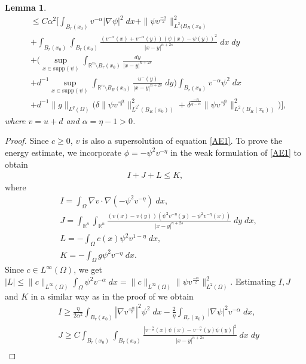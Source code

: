 \documentclass[11pt, notitlepage]{article}
\def\R{\mathbb{R}}
\newtheorem{Lemma}[Theorem]{Lemma}
\begin{document}
{\begin{Lemma}
\begin{align}
        &\leq C\alpha^2\Big[\int_{B_r(x_0)}v^{-\alpha}|\nabla\psi|^2\;dx+\|\psi v^\frac{-\alpha}{2}\|_{L^2(B_R(x_0)}^2\nonumber\\
        &+\int_{B_r(x_0)}\int_{B_r(x_0)}\frac{(v^{-\alpha}(x)+v^{-\alpha}(y))(\psi(x)-\psi(y))^2}{|x-y|^{n+2s}}\;dx\;dy\nonumber\\
        &+\Big(\sup_{x\in\mathrm{supp}(\psi)}\int_{\R^n\setminus B_r(x_0)}\frac{dy}{|x-y|^{n+2s}}\nonumber\\
        &+d^{-1}\sup_{x\in\mathrm{supp}(\psi)}\int_{\R^n\setminus B_R(x_0)}\frac{u^{-}(y)}{|x-y|^{n+2s}}\;dy\Big)\int_{B_r(x_0)}v^{-\alpha}\psi^2\;dx\nonumber\\
        &+d^{-1}\|g\|_{L^q(\Omega)}\Big(\delta\|\psi v^\frac{-\alpha}{2}\|_{L^{2^*}(B_R(x_0))}^2+\delta^\frac{-n}{q-n}\|\psi v^\frac{-\alpha}{2}\|_{L^{2}(B_R(x_0))}^2\Big) \Big],
    \end{align}
    where $v=u+d$ and $\alpha=\eta-1>0$.
\end{Lemma}
\begin{proof}
Since $c\geq 0$, $v$ is also a supersolution of equation \eqref{AE1}. To prove the energy estimate, we incorporate $\phi=-\psi^2 v^{-\eta}$ in the weak formulation of \eqref{AE1} to obtain
\begin{align}\label{I1}
    I+J+L\leq K,
\end{align}
where 
\begin{align*}
    &I=\int_\Omega\nabla v\cdot \nabla(-\psi^2 v^{-\eta})\;dx,\\
    &J=\int_{\R^n}\int_{\R^n}\frac{(v(x)-v(y))(\psi^2 v^{-\eta}(y)-\psi^2 v^{-\eta}(x))}{|x-y|^{n+2s}}\;dy\;dx,\\
    &L=-\int_\Omega c(x)\psi^2 v^{1-\eta}\;dx,\\
    &K=-\int_\Omega g\psi^2 v^{-\eta}\;dx.
\end{align*}
Since $c\in L^\infty(\Omega)$, we get $|L|\leq \|c\|_{L^{\infty}(\Omega)}\int_\Omega \psi^2v^{-\alpha}\;dx=\|c\|_{L^\infty(\Omega)}\|\psi v^\frac{-\alpha}{2}\|_{L^2(\Omega)}^2$. Estimating $I,J$ and $K$ in a similar way as in the proof of \cite[Lemma 3.1 (a)]{Garain25} we obtain
\begin{align*}
    &I\geq \frac{\eta}{2\alpha^2}\int_{B_r(x_0)}|\nabla v^\frac{-\alpha}{2}|^2\psi^2\;dx-\frac{2}{\eta}\int_{B_r(x_0)}|\nabla\psi|^2v^{-\alpha}\;dx,\nonumber\\
    &J\geq C\int_{B_r(x_0)}\int_{B_r(x_0)}\frac{|v^{-\frac{\alpha}{2}}(x)\psi(x)-v^{-\frac{\alpha}{2}}(y)\psi(y)|^2}{|x-y|^{n+2s}}\;dx\;dy\nonumber\\

\end{align*}
\end{proof}}
\end{document}
